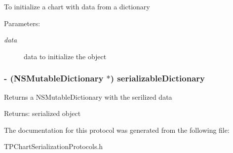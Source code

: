 To initialize a chart with data from a dictionary \begin{Desc}
\item[Parameters:]
\begin{description}
\item[{\em data}]data to initialize the object \end{description}
\end{Desc}
\hypertarget{protocol_t_p_chart_serialization_property_list_dictionary-p_fe0efcbee8a5b37a2c14568c6c111348}{
\subsubsection[{serializableDictionary}]{\setlength{\rightskip}{0pt plus 5cm}- (NSMutableDictionary $\ast$) serializableDictionary }}
\label{protocol_t_p_chart_serialization_property_list_dictionary-p_fe0efcbee8a5b37a2c14568c6c111348}


Returns a NSMutableDictionary with the serilized data \begin{Desc}
\item[Returns:]serialized object \end{Desc}


The documentation for this protocol was generated from the following file:\begin{CompactItemize}
\item 
TPChartSerializationProtocols.h\end{CompactItemize}
